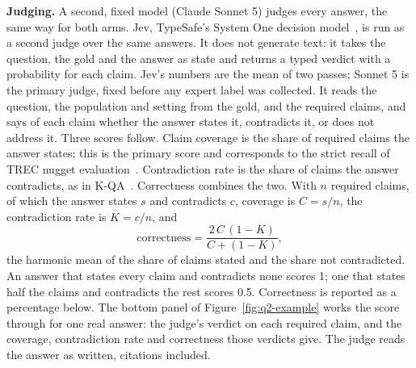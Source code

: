 \documentclass[sn-mathphys,Numbered]{sn-jnl}%
\newcommand{\lead}[1]{\textbf{#1}}   %
\begin{document}
\lead{Judging.} A second, fixed model (Claude Sonnet 5) judges every answer, the same
way for both arms. Jev, TypeSafe's System One decision model~\cite{jev}, is run as a
second judge over the same answers. It does not generate text:
it takes the question, the gold and the answer as state and returns a typed verdict
with a probability for each claim. Jev's numbers are the mean of two passes; Sonnet 5
is the primary judge, fixed before any expert label was collected. It reads the question, the population and setting from the gold, and
the required claims, and says of each claim whether the answer states it, contradicts
it, or does not address it. Three scores follow. Claim coverage is the share of required
claims the answer states; this is the primary score and corresponds to the strict recall
of TREC nugget evaluation~\cite{nuggetrecall}. Contradiction
rate is the share of claims the answer contradicts, as in K-QA~\cite{kqa}. Correctness combines the two. With $n$ required claims, of which the answer states $s$
and contradicts $c$, coverage is $C = s/n$, the contradiction rate is $K = c/n$, and
%
\begin{equation}
  \text{correctness} = \frac{2\,C\,(1-K)}{C + (1-K)},
  \label{eq:correctness}
\end{equation}
%
the harmonic mean of the share of claims stated and the share not contradicted. An
answer that states every claim and contradicts none scores 1; one that states half the
claims and contradicts the rest scores 0.5. Correctness is reported as a percentage
below. The bottom panel of Figure~\ref{fig:q2-example}
works the score through for one real answer: the judge's verdict on each required claim,
and the coverage, contradiction rate and correctness those verdicts give. The judge reads the
answer as written, citations included.
\end{document}
